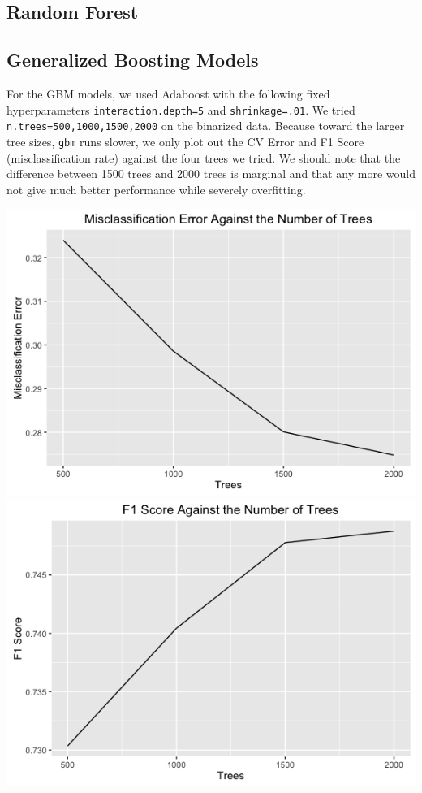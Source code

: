 \documentclass{article}
\begin{document}
\subsection{Random Forest}

\subsection{Generalized Boosting Models}
For the GBM models, we used Adaboost with the following fixed hyperparameters \texttt{interaction.depth=5} and \texttt{shrinkage=.01}. We tried \texttt{n.trees=500,1000,1500,2000} on the binarized data. Because toward the larger tree sizes, \texttt{gbm} runs slower, we only plot out the CV Error and F1 Score (misclassification rate) against the four trees we tried. We should note that the difference between 1500 trees and 2000 trees is marginal and that any more would not give much better performance while severely overfitting. \\
\centerline{\includegraphics[scale=.35]{diagrams/4gbm.png}\includegraphics[scale=.35]{diagrams/5gbm.png}}
\end{document}
